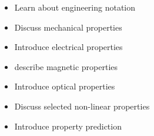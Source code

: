 \begin{learningobjectives}
{\begin{itemize}
    \item[{\color{OCBurntOrange}\ref{\chabbr:sec:engineering}:}] Learn about engineering notation
    \item[{\color{OCBurntOrange}\ref{\chabbr:sec:mechprop}:}] Discuss mechanical properties 
    \item[{\color{OCBurntOrange}\ref{\chabbr:sec:emag}:}] Introduce electrical properties 
    \item[{\color{OCBurntOrange}\ref{\chabbr:sec:magprop}:}] describe magnetic properties 
    \item[{\color{OCBurntOrange}\ref{\chabbr:sec:optical}:}] Introduce optical properties 
    \item[{\color{OCBurntOrange}\ref{\chabbr:sec:nonlinear}:}] Discuss selected non-linear properties 
    \item[{\color{OCBurntOrange}\ref{\chabbr:sec:atomistic}:}] Introduce property prediction 
\end{itemize}}
\end{learningobjectives}

